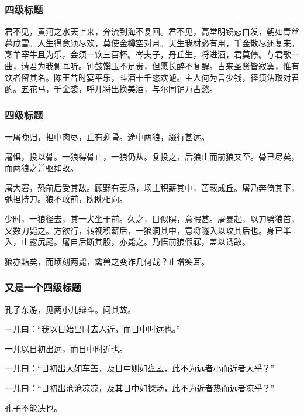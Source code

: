 \documentclass[
    bachelor, 
    ]{xjtuthesis}
\begin{document}
                \subsubsection{四级标题}
                    
                君不见，黄河之水天上来，奔流到海不复回。君不见，高堂明镜悲白发，朝如青丝暮成雪。人生得意须尽欢，莫使金樽空对月。天生我材必有用，千金散尽还复来。烹羊宰牛且为乐，会须一饮三百杯。岑夫子，丹丘生，将进酒，君莫停。与君歌一曲，请君为我侧耳听。钟鼓馔玉不足贵，但愿长醉不复醒。古来圣贤皆寂寞，惟有饮者留其名。陈王昔时宴平乐，斗酒十千恣欢谑。主人何为言少钱，径须沽取对君酌。五花马，千金裘，呼儿将出换美酒，与尔同销万古愁。

                \subsubsection{四级标题}

                    一屠晚归，担中肉尽，止有剩骨。途中两狼，缀行甚远。

                    屠惧，投以骨。一狼得骨止，一狼仍从。复投之，后狼止而前狼又至。骨已尽矣，而两狼之并驱如故。

                    屠大窘，恐前后受其敌。顾野有麦场，场主积薪其中，苫蔽成丘。屠乃奔倚其下，弛担持刀。狼不敢前，眈眈相向。

                    少时，一狼径去，其一犬坐于前。久之，目似瞑，意暇甚。屠暴起，以刀劈狼首，又数刀毙之。方欲行，转视积薪后，一狼洞其中，意将隧入以攻其后也。身已半入，止露尻尾。屠自后断其股，亦毙之。乃悟前狼假寐，盖以诱敌。

                    狼亦黠矣，而顷刻两毙，禽兽之变诈几何哉？止增笑耳。

                \subsubsection{又是一个四级标题}

                    孔子东游，见两小儿辩斗。问其故。

                    一儿曰：“我以日始出时去人近，而日中时远也。”

                    一儿以日初出远，而日中时近也。

                    一儿曰：“日初出大如车盖，及日中则如盘盂，此不为远者小而近者大乎？”

                    一儿曰：“日初出沧沧凉凉，及其日中如探汤，此不为近者热而远者凉乎？”

                    孔子不能决也。
\end{document}
